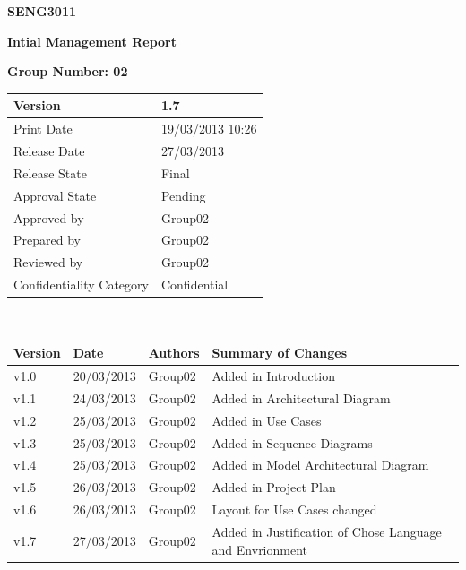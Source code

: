 \documentclass[a4paper]{article}
\begin{document}
\thispagestyle{empty}
\begin {center}
\Large\textbf{SENG3011} 

\Large\textbf{Intial Management Report}

\bigskip\Large\textbf{Group Number: 02}

\end{center}

\vspace*{16.5cm}
\begin{tabular}{|l|l|}
  \hline
  Version         & 1.7\\\hline
  Print Date      & 19/03/2013 10:26\\\hline
  Release Date    & 27/03/2013\\\hline
  Release State   & Final \\\hline
  Approval State  & Pending \\\hline
  Approved by     & Group02 \\\hline
  Prepared by     & Group02 \\\hline
  Reviewed by     & Group02 \\\hline
  Confidentiality Category  & Confidential\\\hline
\end{tabular}
\pagebreak



\thispagestyle{plain}     %
\setcounter{page}{1}      %
\renewcommand{\thepage}{\roman{page}}  %

\\[2ex]
\begin{tabular}{|l|l|l|l|}
  \hline
  Version & Date & Authors & Summary of Changes\\\hline\hline
	v1.0 & 20/03/2013 & Group02 & Added in Introduction           	\\\hline
	v1.1 & 24/03/2013 & Group02 & Added in Architectural Diagram 		\\\hline
	v1.2 & 25/03/2013 & Group02 & Added in Use Cases  		\\\hline
	v1.3 & 25/03/2013 & Group02 & Added in Sequence Diagrams		\\\hline
	v1.4 & 25/03/2013 & Group02 & Added in Model Architectural Diagram 		\\\hline
	v1.5 & 26/03/2013 & Group02 & Added in Project Plan		\\\hline
	v1.6 & 26/03/2013 & Group02 & Layout for Use Cases changed 		\\\hline
	v1.7 & 27/03/2013 & Group02 & Added in Justification of Chose Language and Envrionment 		\\\hline
\end{tabular}
\end{document}
